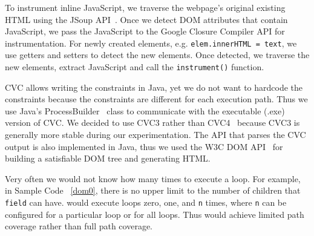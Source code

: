 To instrument inline JavaScript, we traverse the webpage's original existing HTML using the JSoup API~\cite{jsoup}.  
Once we detect DOM attributes that contain JavaScript, we pass the JavaScript to the Google Closure Compiler API for instrumentation.  
For newly created elements, e.g. {\tt elem.innerHTML = text}, we use getters and setters to detect the new elements.  
Once detected, we traverse the new elements, extract JavaScript and call the {\tt instrument()} function.  


CVC allows writing the constraints in Java, yet we do not want to hardcode the constraints because the constraints are different for each execution path.  
Thus we use Java's ProcessBuilder~\cite{processbuilder} class to communicate with the executable (.exe) version of CVC.  We decided to use CVC3 \cite{cvc3} rather than CVC4~\cite{cvc4} because CVC3 is generally more stable during our experimentation.  
The API that parses the CVC output is also implemented in Java, thus we used the W3C DOM API~\cite{DomAPI} for building a satisfiable DOM tree and generating HTML.  


Very often we would not know how many times to execute a loop.  For example, in Sample Code ~\ref{dom0}, there is no upper limit to the number of children that {\tt field} can have.  
\tool would execute loops zero, one, and {\tt n} times, where {\tt n} can be configured for a particular loop or for all loops.  Thus \tool would achieve limited path coverage rather than full path coverage.  




